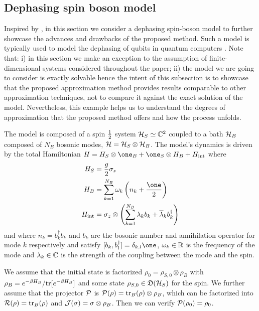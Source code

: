 \documentclass[10pt,aps,pra,twocolumn,showpacs,superscriptaddress,nobalancelastpage,notitlepage,nofootinbib,longbibliography]{revtex4-2}
\begin{document}
\subsection{Dephasing spin boson model}
\label{sec:spin_boson}

Inspired by \cite{lidar2001completely, reina2002decoherence, breuer2002theory, lidar2020lecturenotestheoryopen}, in this section we consider a dephasing spin-boson model to further showcase the advances and drawbacks of the proposed method. Such a model is typically used to model the dephasing of qubits in quantum computers \cite{sun2025quantum}. Note that: i) in this section we make an exception to the assumption of finite-dimensional systems considered throughout the paper; ii) the model we are going to consider is exactly solvable hence the intent of this subsection is to showcase that the proposed approximation method provides results comparable to other approximation techniques, not to compare it against the exact solution of the model. 
Nevertheless, this example helps us to understand the degrees of approximation that the proposed method offers and how the process unfolds.

The model is composed of a spin $\frac{1}{2}$ system $\mathcal{H}_S\simeq\mathbb{C}^2$ coupled to a bath $\mathcal{H}_B$ composed of $N_B$ bosonic modes, $\mathcal{H} = \mathcal{H}_S\otimes \mathcal{H}_B$. The model's dynamics is driven by the total Hamiltonian $H= H_S\otimes \one_B + \one_S \otimes H_B + H_{\rm int}$ where 
\begin{align}
    H_S &= \frac{g}{2}\sigma_z\\
    H_B &= \sum_{k=1}^{N_B} \omega_k \left(n_k+\frac{\one}{2}\right)\\
    H_{\rm int} &= \sigma_z \otimes \left(\sum_{k=1}^{N_B}\lambda_k b_k + \overline{\lambda}_k b_k^\dag\right)
\end{align} 
and where $n_k = b_k^\dag b_k$ and $b_k$ are the bosonic number and annihilation operator for mode $k$ respectively and satisfy $[b_k,b_l^\dag]=\delta_{k,l}\one$, $\omega_k\in\mathbb{R}$ is the frequency of the mode and $\lambda_k\in\mathbb{C}$ is the strength of the coupling between the mode and the spin.  

We assume that the initial state is factorized $\rho_0 = \rho_{S,0}\otimes\rho_B$ with $\rho_B = e^{-\beta H_B}/{\rm tr}[e^{-\beta H_B}]$ and some state $\rho_{S,0}\in\mathfrak{D}(\mathcal{H}_S)$ for the spin. We further assume that the projector $\mathcal{P}$ is $\mathcal{P}(\rho) = {\rm tr}_B(\rho)\otimes \rho_B$, which can be factorized into $\mathcal{R}(\rho) = {\rm tr}_B(\rho)$ and $\mathcal{J}(\sigma)=\sigma\otimes\rho_B$. Then we can verify $\mathcal{P}(\rho_0) = \rho_0$. 
\end{document}
